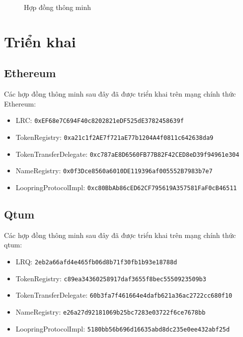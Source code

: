 \documentclass[12pt,a4paper]{article}
\begin{document}
\begin{appendices}
\begin{center}
\begin{figure}[H]
{}
\caption{Hợp đồng thông minh}
\label{fig:smartcontracts}
\end{figure}
\end{center}

\section{Triển khai}
\subsection{Ethereum}
Các hợp đồng thông minh sau đây đã được triển khai trên mạng chính thức Ethereum:
\begin{itemize}
\item LRC: \verb|0xEF68e7C694F40c8202821eDF525dE3782458639f|
\item TokenRegistry: \verb|0xa21c1f2AE7f721aE77b1204A4f0811c642638da9|
\item TokenTransferDelegate: \verb|0xc787aE8D6560FB77B82F42CED8eD39f94961e304|
\item NameRegistry:  \verb|0x0f3Dce8560a6010DE119396af005552B7983b7e7|
\item LoopringProtocolImpl: \verb|0xc80BbAb86cED62CF795619A357581FaF0cB46511|
\end{itemize}
\subsection{Qtum}
Các hợp đồng thông minh sau đây đã được triển khai trên mạng chính thức qtum:
\begin{itemize}
\item LRQ: \verb|2eb2a66afd4e465fb06d8b71f30fb1b93e18788d|
\item TokenRegistry: \verb|c89ea34360258917daf3655f8bec5550923509b3|
\item TokenTransferDelegate: \verb|60b3fa7f461664e4dafb621a36ac2722cc680f10|
\item NameRegistry:  \verb|e26a27d92181069b25bc7283e03722f6ce7678bb|
\item LoopringProtocolImpl: \verb|5180bb56b696d16635abd8dc235e0ee432abf25d|
\end{itemize}

\end{appendices}
\end{document}
